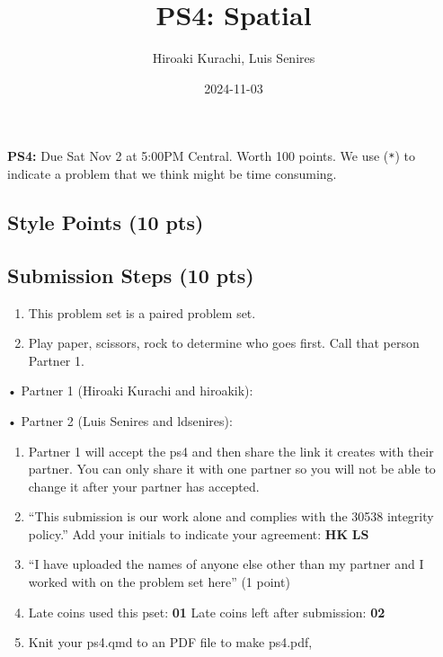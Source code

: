 \documentclass[
  letterpaper,
  DIV=11,
  numbers=noendperiod]{scrartcl}
\title{PS4: Spatial}
\author{Hiroaki Kurachi, Luis Senires}
\date{2024-11-03}
\begin{document}
\maketitle



\textbf{PS4:} Due Sat Nov 2 at 5:00PM Central. Worth 100 points. We use
(\texttt{*}) to indicate a problem that we think might be time
consuming.

\subsection{Style Points (10 pts)}\label{style-points-10-pts}

\subsection{Submission Steps (10 pts)}\label{submission-steps-10-pts}

\begin{enumerate}
\def\labelenumi{\arabic{enumi}.}
\item
  This problem set is a paired problem set.
\item
  Play paper, scissors, rock to determine who goes first. Call that
  person Partner 1.
\end{enumerate}

• Partner 1 (Hiroaki Kurachi and hiroakik):

• Partner 2 (Luis Senires and ldsenires):

\begin{enumerate}
\def\labelenumi{\arabic{enumi}.}
\setcounter{enumi}{2}
\item
  Partner 1 will accept the ps4 and then share the link it creates with
  their partner. You can only share it with one partner so you will not
  be able to change it after your partner has accepted.
\item
  ``This submission is our work alone and complies with the 30538
  integrity policy.'' Add your initials to indicate your agreement:
  \textbf{HK} \textbf{LS}
\item
  ``I have uploaded the names of anyone else other than my partner and I
  worked with on the problem set here'' (1 point)
\item
  Late coins used this pset: \textbf{01} Late coins left after
  submission: \textbf{02}
\item
  Knit your ps4.qmd to an PDF file to make ps4.pdf,
\end{enumerate}
\end{document}

